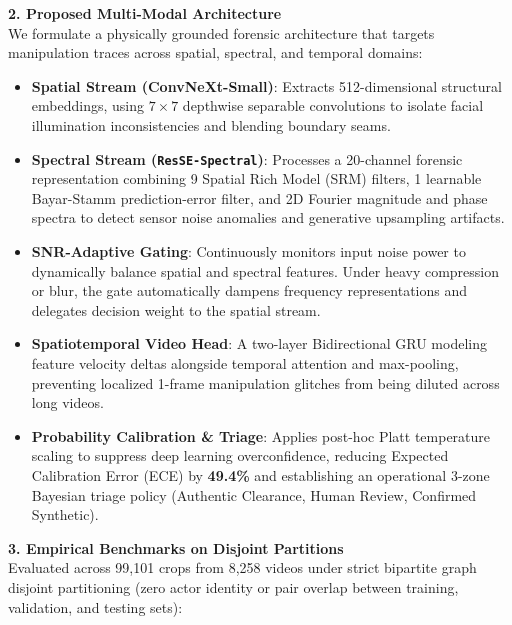 \documentclass[10pt,a4paper]{article}
\begin{document}
\vspace{1.0ex}
\noindent\textbf{2. Proposed Multi-Modal Architecture}\\
We formulate a physically grounded forensic architecture that targets manipulation traces across spatial, spectral, and temporal domains:
\begin{itemize}[leftmargin=*,noitemsep,topsep=2pt]
    \item \textbf{Spatial Stream (ConvNeXt-Small)}: Extracts 512-dimensional structural embeddings, using $7\times 7$ depthwise separable convolutions to isolate facial illumination inconsistencies and blending boundary seams.
    \item \textbf{Spectral Stream (\texttt{ResSE-Spectral})}: Processes a 20-channel forensic representation combining 9 Spatial Rich Model (SRM) filters, 1 learnable Bayar-Stamm prediction-error filter, and 2D Fourier magnitude and phase spectra to detect sensor noise anomalies and generative upsampling artifacts.
    \item \textbf{SNR-Adaptive Gating}: Continuously monitors input noise power to dynamically balance spatial and spectral features. Under heavy compression or blur, the gate automatically dampens frequency representations and delegates decision weight to the spatial stream.
    \item \textbf{Spatiotemporal Video Head}: A two-layer Bidirectional GRU modeling feature velocity deltas alongside temporal attention and max-pooling, preventing localized 1-frame manipulation glitches from being diluted across long videos.
    \item \textbf{Probability Calibration \& Triage}: Applies post-hoc Platt temperature scaling to suppress deep learning overconfidence, reducing Expected Calibration Error (ECE) by \textbf{49.4\%} and establishing an operational 3-zone Bayesian triage policy (Authentic Clearance, Human Review, Confirmed Synthetic).
\end{itemize}

\vspace{1.0ex}
\noindent\textbf{3. Empirical Benchmarks on Disjoint Partitions}\\
Evaluated across 99,101 crops from 8,258 videos under strict bipartite graph disjoint partitioning (zero actor identity or pair overlap between training, validation, and testing sets):
\end{document}
